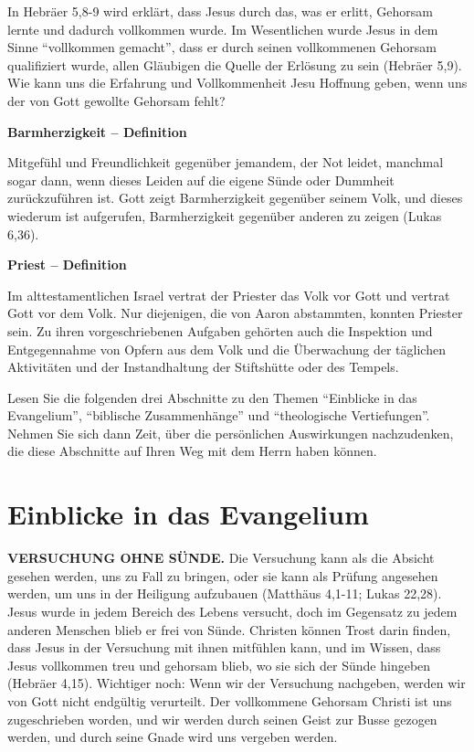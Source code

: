 \documentclass[
  12pt,
]{krantz}
\makeatletter
\newenvironment{kframe}{%
\medskip{}
\setlength{\fboxsep}{.8em}
 \def\at@end@of@kframe{}%
 \ifinner\ifhmode%
  \def\at@end@of@kframe{\end{minipage}}%
  \begin{minipage}{\columnwidth}%
 \fi\fi%
 \def\FrameCommand##1{\hskip\@totalleftmargin \hskip-\fboxsep
 \colorbox{shadecolor}{##1}\hskip-\fboxsep
     \hskip-\linewidth \hskip-\@totalleftmargin \hskip\columnwidth}%
 \MakeFramed {\advance\hsize-\width
   \@totalleftmargin\z@ \linewidth\hsize
   \@setminipage}}%
 {\par\unskip\endMakeFramed%
 \at@end@of@kframe}
\newenvironment{rmdblock}[1]
  {
  \begin{itemize}
  \renewcommand{\labelitemi}{
    \raisebox{-.7\height}[0pt][0pt]{
      {\setkeys{Gin}{width=3em,keepaspectratio}\texttt{[image: img/\#1]}}
    }
  }
  \setlength{\fboxsep}{1em}
  \begin{kframe}
  \item
  }
  {
  \end{kframe}
  \end{itemize}
  }
\newenvironment{rmddefinition}
  {\begin{rmdblock}{definition}}
  {\end{rmdblock}}
\makeatother
\begin{document}
In Hebräer 5,8-9 wird erklärt, dass Jesus durch das, was er erlitt, Gehorsam lernte und dadurch vollkommen wurde. Im Wesentlichen wurde Jesus in dem Sinne ``vollkommen gemacht'', dass er durch seinen vollkommenen Gehorsam qualifiziert wurde, allen Gläubigen die Quelle der Erlösung zu sein (Hebräer 5,9). Wie kann uns die Erfahrung und Vollkommenheit Jesu Hoffnung geben, wenn uns der von Gott gewollte Gehorsam fehlt?

\begin{rmddefinition}
\textbf{Barmherzigkeit -- Definition}

Mitgefühl und Freundlichkeit gegenüber jemandem, der Not leidet,
manchmal sogar dann, wenn dieses Leiden auf die eigene Sünde oder
Dummheit zurückzuführen ist. Gott zeigt Barmherzigkeit gegenüber seinem
Volk, und dieses wiederum ist aufgerufen, Barmherzigkeit gegenüber
anderen zu zeigen (Lukas 6,36).
\end{rmddefinition}

\begin{rmddefinition}
\textbf{Priest -- Definition}

Im alttestamentlichen Israel vertrat der Priester das Volk vor Gott und
vertrat Gott vor dem Volk. Nur diejenigen, die von Aaron abstammten,
konnten Priester sein. Zu ihren vorgeschriebenen Aufgaben gehörten auch
die Inspektion und Entgegennahme von Opfern aus dem Volk und die
Überwachung der täglichen Aktivitäten und der Instandhaltung der
Stiftshütte oder des Tempels.
\end{rmddefinition}

Lesen Sie die folgenden drei Abschnitte zu den Themen ``Einblicke in das Evangelium'', ``biblische Zusammenhänge'' und ``theologische Vertiefungen''. Nehmen Sie sich dann Zeit, über die persönlichen Auswirkungen nachzudenken, die diese Abschnitte auf Ihren Weg mit dem Herrn haben können.

\hypertarget{einblicke-in-das-evangelium}{%
\section{Einblicke in das Evangelium}\label{einblicke-in-das-evangelium}}

\textbf{VERSUCHUNG OHNE SÜNDE.} Die Versuchung kann als die Absicht gesehen werden, uns zu Fall zu bringen, oder sie kann als Prüfung angesehen werden, um uns in der Heiligung aufzubauen (Matthäus 4,1-11; Lukas 22,28). Jesus wurde in jedem Bereich des Lebens versucht, doch im Gegensatz zu jedem anderen Menschen blieb er frei von Sünde. Christen können Trost darin finden, dass Jesus in der Versuchung mit ihnen mitfühlen kann, und im Wissen, dass Jesus vollkommen treu und gehorsam blieb, wo sie sich der Sünde hingeben (Hebräer 4,15). Wichtiger noch: Wenn wir der Versuchung nachgeben, werden wir von Gott nicht endgültig verurteilt. Der vollkommene Gehorsam Christi ist uns zugeschrieben worden, und wir werden durch seinen Geist zur Busse gezogen werden, und durch seine Gnade wird uns vergeben werden.
\end{document}
